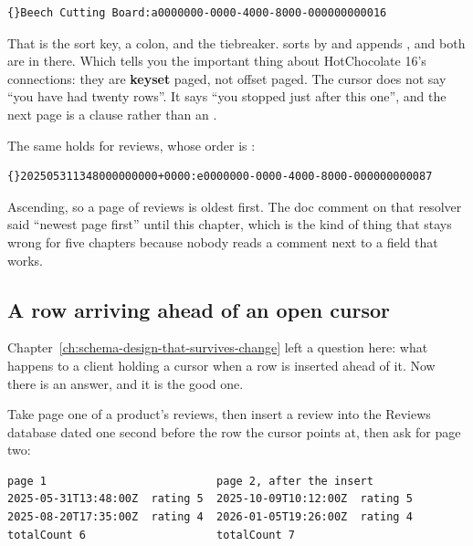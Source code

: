 \begin{verbatim}
{}Beech Cutting Board:a0000000-0000-4000-8000-000000000016
\end{verbatim}

%
That is the sort key, a colon, and the tiebreaker.
 sorts by  and appends ,
and both are in there. Which tells you the important thing about HotChocolate
16's connections: they are \textbf{keyset} paged, not offset paged. The cursor
does not say \enquote{you have had twenty rows}. It says \enquote{you stopped
just after this one}, and the next page is a  clause rather than an
.

The same holds for reviews, whose order is :

\begin{verbatim}
{}202505311348000000000+0000:e0000000-0000-4000-8000-000000000087
\end{verbatim}

Ascending, so a page of reviews is oldest first. The doc comment on that
resolver said \enquote{newest page first} until this chapter, which is the kind
of thing that stays wrong for five chapters because nobody reads a comment next
to a field that works.

\subsection*{A row arriving ahead of an open cursor}

%
Chapter~\ref{ch:schema-design-that-survives-change} left a question here: what
happens to a client holding a cursor when a row is inserted ahead of it. Now
there is an answer, and it is the good one.

Take page one of a product's reviews, then insert a review into the Reviews
database dated one second before the row the cursor points at, then ask for page
two:

\begin{verbatim}
page 1                          page 2, after the insert
2025-05-31T13:48:00Z  rating 5  2025-10-09T10:12:00Z  rating 5
2025-08-20T17:35:00Z  rating 4  2026-01-05T19:26:00Z  rating 4
totalCount 6                    totalCount 7
\end{verbatim}

